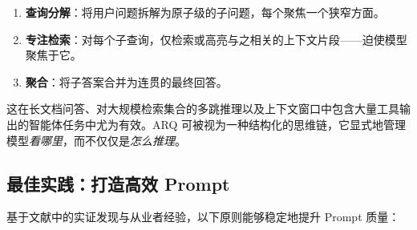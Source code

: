 \begin{enumerate}
  \item \textbf{查询分解}：将用户问题拆解为原子级的子问题，每个聚焦一个狭窄方面。
  \item \textbf{专注检索}：对每个子查询，仅检索或高亮与之相关的上下文片段——迫使模型聚焦于它。
  \item \textbf{聚合}：将子答案合并为连贯的最终回答。
\end{enumerate}

这在长文档问答、对大规模检索集合的多跳推理以及上下文窗口中包含大量工具输出的智能体任务中尤为有效。ARQ 可被视为一种结构化的思维链，它显式地管理模型\emph{看哪里}，而不仅仅是\emph{怎么推理}。

\subsection{最佳实践：打造高效 Prompt}
\label{best-practices-crafting-effective-prompts}

基于文献中的实证发现与从业者经验，以下原则能够稳定地提升 Prompt 质量：

